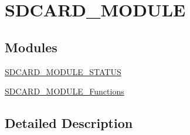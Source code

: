 \hypertarget{group___s_d_c_a_r_d___m_o_d_u_l_e}{}\section{S\+D\+C\+A\+R\+D\+\_\+\+M\+O\+D\+U\+LE}
\label{group___s_d_c_a_r_d___m_o_d_u_l_e}
\subsection*{Modules}
\begin{DoxyCompactItemize}
\item 
\hyperlink{group___s_d_c_a_r_d___m_o_d_u_l_e___s_t_a_t_u_s}{S\+D\+C\+A\+R\+D\+\_\+\+M\+O\+D\+U\+L\+E\+\_\+\+S\+T\+A\+T\+US}
\item 
\hyperlink{group___s_d_c_a_r_d___m_o_d_u_l_e___functions}{S\+D\+C\+A\+R\+D\+\_\+\+M\+O\+D\+U\+L\+E\+\_\+\+Functions}
\end{DoxyCompactItemize}


\subsection{Detailed Description}
